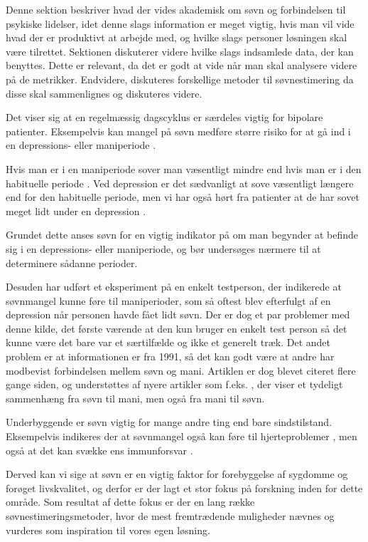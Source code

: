 Denne sektion beskriver hvad der vides akademisk om søvn og forbindelsen til psykiske lidelser, idet denne slags information er meget vigtig, hvis man vil vide hvad der er produktivt at arbejde med, og hvilke slags personer løsningen skal være tilrettet. 
Sektionen diskuterer videre hvilke slags indsamlede data, der kan benyttes. 
Dette er relevant, da det er godt at vide når man skal analysere videre på de metrikker. 
Endvidere, diskuteres forskellige metoder til søvnestimering da disse skal sammenlignes og diskuteres videre.

Det viser sig at en regelmæssig dagscyklus er særdeles vigtig for bipolare patienter.
Eksempelvis kan mangel på søvn medføre større risiko for at gå ind i en depressions- eller maniperiode \citep{CPSP:CPSP1164}.

Hvis man er i en maniperiode sover man væsentligt mindre end hvis man er i den habituelle periode \citep{CPSP:CPSP1164}.
Ved depression er det sædvanligt at sove væsentligt længere end for den habituelle periode, men vi har også hørt fra patienter at de har sovet meget lidt under en depression \citep[Kapitel 2, Sektion 5]{misc:faellesrapp}.

Grundet dette anses søvn for en vigtig indikator på om man begynder at befinde sig i en depressions- eller maniperiode, og bør undersøges nærmere til at determinere sådanne perioder.

Desuden har \citet{art:sleepCusMania} udført et eksperiment på en enkelt testperson, der indikerede at søvnmangel kunne føre til maniperioder, som så oftest blev efterfulgt af en depression når personen havde fået lidt søvn.
Der er dog et par problemer med denne kilde, det første værende at den kun bruger en enkelt test person så det kunne være det bare var et særtilfælde og ikke et generelt træk.
Det andet problem er at informationen er fra 1991, så det kan godt være at andre har modbevist forbindelsen mellem søvn og mani.
Artiklen er dog blevet citeret flere gange siden, og understøttes af nyere artikler som f.eks. \citet{barbini1996sleep}, der viser et tydeligt sammenhæng fra søvn til mani, men også fra mani til søvn.

Underbyggende er søvn vigtig for mange andre ting end bare sindstilstand.
Eksempelvis indikeres der at søvnmangel også kan føre til hjerteproblemer \citep{Mullington2009294,art:sleeplossHeart}, men også at det kan svække ens immunforsvar \citep{misc:sleepImmune}.

Derved kan vi sige at søvn er en vigtig faktor for forebyggelse af sygdomme og forøget livskvalitet, og derfor er der lagt et stor fokus på forskning inden for dette område.
Som resultat af dette fokus er der en lang række søvnestimeringsmetoder, hvor de mest fremtrædende muligheder nævnes og vurderes som inspiration til vores egen løsning.

